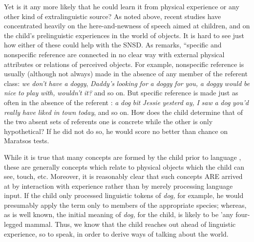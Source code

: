 Yet is it any more likely that he could learn it from physical
experience or any other kind of extralinguistic source? As noted above, recent studies have concentrated heavily on the here-and-newness of speech aimed at children, and on the child's prelinguistic experiences in the world of objects. It is hard to see just how either of these could help with the SNSD. As \citet[94]{Maratsos1976} remarks, ``specific and nonspecific reference are connected in no clear way with external physical attributes or relations of perceived objects. For example, nonspecific reference is usually (although not always) made in the absence of any member of the referent class: \textit{we} \textit{don't} \textit{have} \textit{a} \textit{dogg}\textit{y}, \textit{Dad}\textit{d}\textit{y's} \textit{looki}\textit{n}\textit{g} \textit{for} \textit{a} \textit{doggy} \textit{for} \textit{you,} \textit{a} \textit{doggy} \textit{would} \textit{be} \textit{nice} \textit{to} \textit{play} \textit{with,} \textit{wouldn't} \textit{it?} and so on. But specific reference is made just as often in the absence of the referent : \textit{a} \textit{dog} \textit{bit} \textit{Jessie} \textit{yesterd} \textit{ay,} \textit{I} \textit{saw} \textit{a} \textit{dog} \textit{you'd} \textit{really} \textit{have} \textit{liked} \textit{in} \textit{town} \textit{toda}\textit{y}, and so on. How does the child determine that of the two absent sets of referents one is concrete while the other is only hypothetical? If he did not do so, he would score no better than chance on Maratsos tests.


While it is true that many concepts are formed by the child prior to language , these are generally concepts which relate to physical objects which the child can see, touch, etc. Moreover, it is reasonably clear that such concepts ARE arrived at by interaction with experience rather than by merely processing language input. If the child only processed linguistic tokens of \textit{dog,} for example, he would pre\-sumably apply the term only to members of the appropriate species; whereas, as is well known, the initial meaning of \textit{dog,} for the child, is likely to be 'any four-legged mammal. Thus, we know that the child reaches out ahead of linguistic experience, so to speak, in order
to derive ways of talking about the world.

